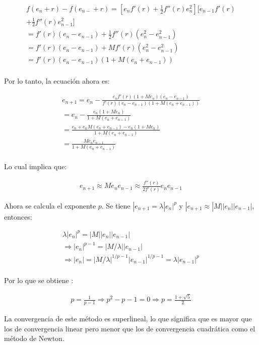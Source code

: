 \begin{gather*}
    f(e_n +r)-f(e_{n-} +r)= [e_nf'(r)+\frac{1}{2}f''(r)e^{2}_n][e_{n-1}f'(r) \\
    +\frac{1}{2}f''(r)e^{2}_{n-1}] \\
    = f'(r)(e_n-e_{n-1})+\frac{1}{2}f''(r)(e^{2}_n -e^{2}_{n-1}) \\
    = f'(r)(e_n-e_{n-1})+Mf'(r)(e^{2}_n -e^{2}_{n-1}) \\
    = f'(r)(e_n-e_{n-1})(1+M(e_n +e_{n-1})) \\
\end{gather*}


Por lo tanto, la ecuación  ahora es:


\begin{gather*}
    e_{n+1}= e_{n} - \frac{e_nf'(r)(1+Me_n)(e_n -e_{n-1})}{f'(r)(e_n-e_{n-1})(1+M(e_n +e_{n-1}))} \\
    = e_{n} - \frac{e_n(1+Me_n)}{1+M(e_n+e_{n-1})} \\
    = \frac{e_n+e_n M(e_n+e_{n-1})-e_n(1+Me_n)}{1+M(e_n+e_{n-1})} \\
    = \frac{M e_n e_{n-1}}{1+M(e_n+e_{n-1})} \\
\end{gather*}


Lo cual implica que:

\begin{gather*}
    e_{n+1} \approx M e_n e_{n-1} \approx \frac{f''(r)}{2f'(r)} e_n e_{n-1}
\end{gather*}

Ahora se calcula el exponente $p$. Se tiene $|e_{n+1}= \lambda|e_n|^{p}$ y $|e_{n+1} \approx |M||e_n||e_{n-1}|$, entonces:

\begin{gather*}
    \lambda|e_n|^{p}=|M||e_n||e_{n-1}| \\
    \Rightarrow |e_n|^{p-1}=|M/\lambda||e_{n-1}| \\
    \Rightarrow |e_n|=|M/\lambda|^{1/{p-1}}|e_{n-1}|^{1/{p-1}}= \lambda|e_{n-1}|^{p} \\
\end{gather*} 

Por lo que se obtiene \cite{edwards}:

\begin{gather*}
    p=\frac{1}{p-1} \Rightarrow p^{2}-p-1=0 \Rightarrow p = \frac{1+ \sqrt{5}}{2}
\end{gather*} 

La convergencia de este método es superlineal, lo que significa que es mayor que los de convergencia linear pero menor que los de convergencia cuadrática como el método de Newton.

